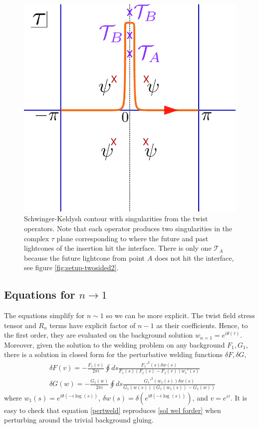 \documentclass[11pt,oneside,letterpaper]{article}
\newcommand{\p}{\partial}
\newcommand{\f}{\frac}
\let\l=\lambda \let\m=\mu \let\n=\nu \let\x=\xi \let\p=\phi \let\r=v
\let\f=\frac
\renewcommand{\p}{\partial}
\numberwithin{equation}{section}
\def\m{{\mu}}
\def\n{{\nu}}
\def\p{{\phi}}
\def\r{\rightarrow}
\def\f {\frac}
\def\l{\left}
\def\r{\right}
\def\x{\bar{x}}
\renewcommand{\p}{\partial}
\begin{document}
\begin{spacing}{1.1}
\begin{figure}
\begin{center}
\includegraphics[scale=0.6]{figures/skcontour_replicasvg.pdf}
\end{center}
\caption{Schwinger-Keldysh contour with singularities from the twist operators. Note that each operator produces two singularities in the complex $\tau$ plane corresponding to where the future and past lightcones of the insertion hit the interface. There is only one $\mathcal{T}_A$ because the future lightcone from point $A$ does not hit the interface, see figure \ref{fig:setup-twosided2}.\label{fig:SKtwist} 
}
\end{figure}


\subsection{Equations for $n\to1$}

The equations simplify for $n\sim1$ so we can be more explicit. The twist field stress tensor and $R_n$ terms have explicit factor of $n-1$ as their coefficients. Hence, to the first order, they are evaluated on the background solution $w_{n=1} =e^{ i \theta(\tau)}$. 
Moreover, given the solution to the welding problem on any background $F_1, G_1$, there is a solution in closed form for the perturbative welding functions\cite{KIRILLOV1998735} $\delta F , \delta G$,
\begin{align}\label{pertweld}
&\delta F(v)= -\f{F_1(v)}{2\pi i} \oint ds \f{F_1'^2(s) \delta w(s)}{F_1(s) (F_1(s)- F_1(v)) w_1'(s) } \nonumber\\
&\delta G(w)= -\f{G_1(w)}{2\pi i} \oint ds \f{G_1'^2(w_1(s)) \delta w(s)}{ G_1(w(s)) \l(G_1(w_1(s))- G_1(w)\r) }
\end{align}
where $w_1 (s) = e^{i \theta(-i \log(s))}$, $\delta w(s) = \delta \l( e^{i \theta(-i \log(s))} \r)$, and  $v=e^{ i \tau}$.  It is easy to check that equation \eqref{pertweld} reproduces \eqref{sol wel forder} when perturbing around the trivial background gluing. 


\end{spacing}
\end{document}
